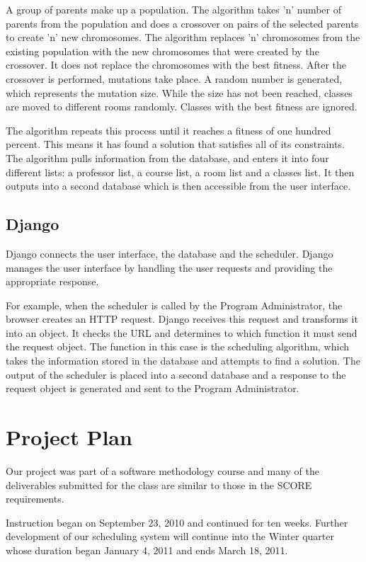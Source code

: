 \documentclass[12pt]{article}
\begin{document}
\begin{enumerate}
\begin{enumerate}
A group of parents make up a population. The algorithm takes 'n' number of parents from the population and does a crossover on pairs of the selected parents to create 'n' new chromosomes. The algorithm replaces 'n' chromosomes from the existing population with the new chromosomes that were created by the crossover. It does not replace the chromosomes with the best fitness. After the crossover is performed, mutations take place. A random number is generated, which represents the mutation size. While the size has not been reached, classes are moved to different rooms randomly. Classes with the best fitness are ignored. 

The algorithm repeats this process until it reaches a fitness of one hundred percent. This means it has found a solution that satisfies all of its constraints. The algorithm pulls information from the database, and enters it into four different lists: a professor list, a course list, a room list and a classes list. It then outputs into a second database which is then accessible from the user interface. 

\subsection{Django}
Django connects the user interface, the database and the scheduler. Django manages the user interface by handling the user requests and providing the appropriate response. 

For example, when the scheduler is called by the Program Administrator, the browser creates an HTTP request. Django receives this request and transforms it into an object. It checks the URL and determines to which function it must send the request object. The function in this case is the scheduling algorithm, which takes the information stored in the database and attempts to find a solution. The output of the scheduler is placed into a second database and a response to the request object is generated and sent to the Program Administrator.

\section{Project Plan} %

Our project was part of a software methodology course and many of the deliverables submitted for the class are similar to those in the SCORE requirements. 

Instruction began on September 23, 2010 and continued for ten weeks. Further development of our scheduling system will continue into the Winter quarter whose duration began January 4, 2011 and ends March 18, 2011. 


\end{enumerate}
\end{enumerate}
\end{document}
